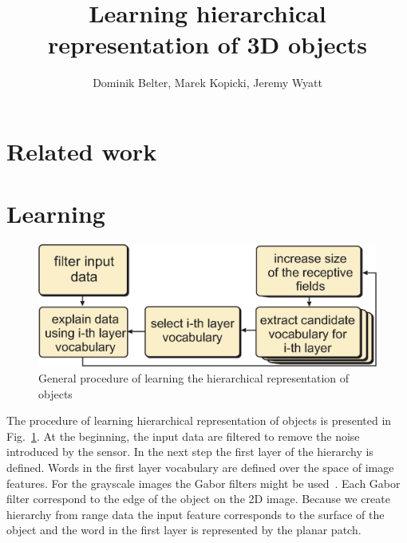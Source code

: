 \documentclass[letterpaper,10pt,conference]{ieeeconf}  %
\title{\LARGE \bf
 Learning hierarchical representation of 3D objects
}
\author{Dominik Belter, Marek Kopicki, Jeremy Wyatt%
}
\begin{document}
\maketitle
\thispagestyle{empty}
\pagestyle{empty}


\begin{abstract}
\end{abstract}



\section{Related work}

\section{Learning}


\begin{figure}[t]
 \centering
\includegraphics[width=0.9\columnwidth]{../images/learningGeneral.eps}
\caption{General procedure of learning the hierarchical representation of objects}
 \label{hopProc}
\end{figure}

The procedure of learning hierarchical representation of objects is presented in Fig.~\ref{hopProc}. At the beginning, the input data are filtered to remove the noise introduced by the sensor. In the next step the first layer of the hierarchy is defined. Words in the first layer vocabulary are defined over the space of image features. For the grayscale images the Gabor filters might be used~\cite{Fiedler2014}. Each Gabor filter correspond to the edge of the object on the 2D image. Because we create hierarchy from range data the input feature corresponds to the surface of the object and the word in the first layer is represented by the planar patch. 
\end{document}
